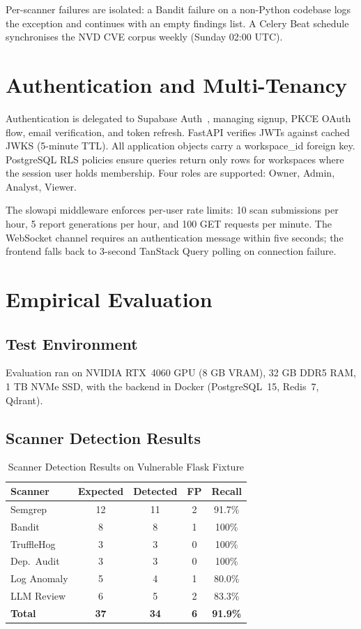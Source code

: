 \documentclass[conference]{IEEEtran}
\begin{document}
Per-scanner failures are isolated: a Bandit failure on a non-Python
codebase logs the exception and continues with an empty findings list.
A Celery Beat schedule synchronises the NVD CVE corpus weekly (Sunday
02:00 UTC).

\section{Authentication and Multi-Tenancy}
\label{sec:auth}

Authentication is delegated to Supabase Auth~\cite{supabase}, managing
signup, PKCE OAuth flow, email verification, and token refresh. FastAPI
verifies JWTs against cached JWKS (5-minute TTL). All application
objects carry a workspace\_id foreign key. PostgreSQL RLS policies ensure
queries return only rows for workspaces where the session user holds
membership. Four roles are supported: Owner, Admin, Analyst, Viewer.

The slowapi middleware enforces per-user rate limits: 10 scan submissions
per hour, 5 report generations per hour, and 100 GET requests per minute.
The WebSocket channel requires an authentication message within five
seconds; the frontend falls back to 3-second TanStack Query polling on
connection failure.

\section{Empirical Evaluation}
\label{sec:eval}

\subsection{Test Environment}
Evaluation ran on NVIDIA RTX~4060 GPU (8 GB VRAM), 32 GB DDR5 RAM, 1 TB
NVMe SSD, with the backend in Docker (PostgreSQL~15, Redis~7, Qdrant).

\subsection{Scanner Detection Results}

\begin{table}[htbp]
\centering
\caption{Scanner Detection Results on Vulnerable Flask Fixture}
\label{tab:scanner}
\scriptsize
\begin{tabular}{@{}lcccc@{}}
\toprule
\textbf{Scanner} & \textbf{Expected} & \textbf{Detected} & \textbf{FP} & \textbf{Recall} \\
\midrule
Semgrep      & 12 & 11 & 2 & 91.7\% \\
Bandit       &  8 &  8 & 1 & 100\%  \\
TruffleHog   &  3 &  3 & 0 & 100\%  \\
Dep.\ Audit  &  3 &  3 & 0 & 100\%  \\
Log Anomaly  &  5 &  4 & 1 & 80.0\% \\
LLM Review   &  6 &  5 & 2 & 83.3\% \\
\midrule
\textbf{Total} & \textbf{37} & \textbf{34} & \textbf{6} & \textbf{91.9\%} \\
\bottomrule
\end{tabular}
\end{table}
\end{document}

